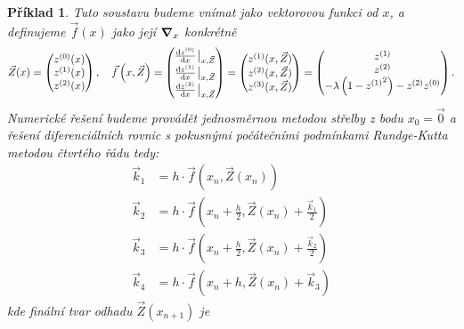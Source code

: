 \documentclass{article}
\newtheorem{example}{Příklad}
\begin{document}
\begin{example}
	Tuto soustavu budeme vnímat jako vektorovou funkci od $x$, a definujeme $\vec{f}(x)$ jako její $\grad_x$ konkrétně
	\begin{equation}
		\vec{Z}(x) =
		\begin{pmatrix}
			z^{(0)}(x) \\
			z^{(1)}(x) \\
			z^{(2)}(x) \\
		\end{pmatrix} \qcomma
		\vec{f}\left(x,\vec{Z}\right) =
		\begin{pmatrix}
			\dv{z^{(0)}}{x}\eval_{x,\vec{Z}} \\
			\dv{z^{(1)}}{x}\eval_{x,\vec{Z}} \\
			\dv{z^{(2)}}{x}\eval_{x,\vec{Z}} \\
		\end{pmatrix}  =
		\begin{pmatrix}
			z^{(1)}(x,\vec{Z}) \\
			z^{(2)}(x,\vec{Z}) \\
			z^{(3)}(x,\vec{Z}) \\
		\end{pmatrix} =
		\begin{pmatrix}
			z^{(1)} \\
			z^{(2)} \\
			-\lambda \left( 1 - {z^{(1)}}^{2} \right)  - z^{(2)}z^{(0)}
		\end{pmatrix}.
	\end{equation}
	Numerické řešení budeme provádět jednosměrnou metodou střelby z bodu $x_{0} = \vec{0}$ a řešení diferenciálních rovnic s pokusnými počátečními podmínkami Rundge-Kutta metodou čtvrtého řádu tedy:
	\begin{equation}
		\begin{aligned}
			\vec{k}_{1} & = h \cdot \vec{f}\left(  x_{n}, \vec{Z}(x_{n}) \right)                                       \\
			\vec{k}_{2} & = h \cdot \vec{f}\left(  x_{n} + \frac{h}{2}, \vec{Z}(x_{n}) + \frac{\vec{k}_{1}}{2} \right) \\
			\vec{k}_{3} & = h \cdot \vec{f}\left( x_{n} + \frac{h}{2}, \vec{Z}(x_{n}) + \frac{\vec{k}_{2}}{2}  \right) \\
			\vec{k}_{4} & = h \cdot \vec{f}\left( x_{n} + h, \vec{Z}(x_{n}) + \vec{k}_{3}  \right)
		\end{aligned}
	\end{equation}
	kde finální tvar odhadu $\vec{Z}(x_{n+1})$ je
	\begin{equation}

\end{equation}
\end{example}
\end{document}
